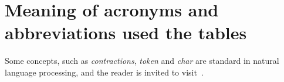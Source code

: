 \documentclass[%
 aip,
 jmp,%
 amsmath,amssymb,
 reprint,%
]{revtex4-1}
\begin{document}
\section{Meaning of acronyms and abbreviations used the tables}

Some concepts, such as \emph{contractions}, \emph{token} and \emph{char} are standard in natural language processing, and the reader is invited to visit~\cite{nltkBook}.


\end{document}
